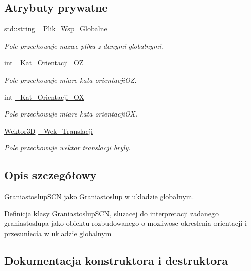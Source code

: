 \subsection*{Atrybuty prywatne}
\begin{DoxyCompactItemize}
\item 
std\+::string \hyperlink{classGraniastoslupSCN_abd53a52e6fa9127c98d3922b4134fe67}{\+\_\+\+Plik\+\_\+\+Wsp\+\_\+\+Globalne}
\begin{DoxyCompactList}\small\item\em Pole przechowuje nazwe pliku z danymi globalnymi. \end{DoxyCompactList}\item 
int \hyperlink{classGraniastoslupSCN_a9fd5ceb4bf6119ef152db01d43d4925c}{\+\_\+\+Kat\+\_\+\+Orientacji\+\_\+\+OZ}
\begin{DoxyCompactList}\small\item\em Pole przechowuje miare kata orientacji\+OZ. \end{DoxyCompactList}\item 
int \hyperlink{classGraniastoslupSCN_a6c82bb652a2a7ebefc166864af4be36a}{\+\_\+\+Kat\+\_\+\+Orientacji\+\_\+\+OX}
\begin{DoxyCompactList}\small\item\em Pole przechowuje miare kata orientacji\+OX. \end{DoxyCompactList}\item 
\hyperlink{classSWektor}{Wektor3D} \hyperlink{classGraniastoslupSCN_a8d6e1399862324d18f3dee74c41212d0}{\+\_\+\+Wek\+\_\+\+Translacji}
\begin{DoxyCompactList}\small\item\em Pole przechowuje wektor translacji bryly. \end{DoxyCompactList}\end{DoxyCompactItemize}


\subsection{Opis szczegółowy}
\hyperlink{classGraniastoslupSCN}{Graniastoslup\+S\+CN} jako \hyperlink{classGraniastoslup}{Graniastoslup} w ukladzie globalnym. 

Definicja klasy \hyperlink{classGraniastoslupSCN}{Graniastoslup\+S\+CN}, sluzacej do interpretacji zadanego graniastoslupa jako obiektu rozbudowanego o mozliwosc okreslenia orientacji i przesuniecia w ukladzie globalnym 

\subsection{Dokumentacja konstruktora i destruktora}
\mbox{\label{classGraniastoslupSCN_a1cf442360ec14fc7fa22af9ddefd1d35}} 

